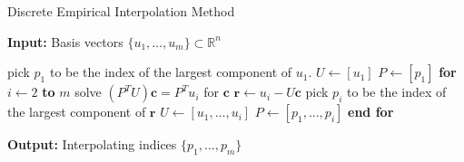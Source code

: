 \begin{algorithm} 
\caption{Discrete Empirical Interpolation Method}
{\bf Input:}  Basis vectors $\{u_1,\dots , u_m\}\subset \mathbb R^n$
\begin{algorithmic} [1]
\State pick $p_1$ to be the index of the largest component of $u_1$.
\State $U \leftarrow [u_1]$
\State $P \leftarrow [p_1]$
\State \textbf{for} $i\leftarrow 2$ \textbf{to} $m$
\State \hspace{0.5cm} solve $(P^TU)\mathbf c = P^T u_i$ for $\mathbf c$
\State \hspace{0.5cm} $\mathbf r \leftarrow u_i - U\mathbf c$
\State \hspace{0.5cm} pick $p_i$ to be the index of the largest component of $\mathbf r$
\State \hspace{0.5cm} $U \leftarrow [u_1,\dots,u_i]$
\State \hspace{0.5cm} $P \leftarrow [p_1,\dots,p_i]$
\State \textbf{end for}
\end{algorithmic}
\vspace{0.5cm}
{\bf Output:} Interpolating indices $\{p_1,\dots,p_m\}$
\end{algorithm}


